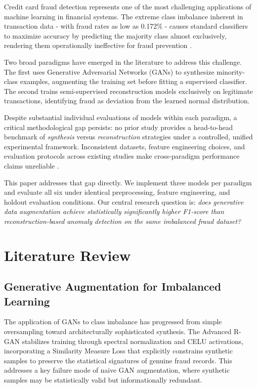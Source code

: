 \documentclass[conference]{IEEEtran}
\begin{document}
Credit card fraud detection represents one of the most challenging
applications of machine learning in financial systems. The extreme class
imbalance inherent in transaction data - with fraud rates as low as
0.172\% - causes standard classifiers to maximize accuracy by predicting
the majority class almost exclusively, rendering them operationally
ineffective for fraud prevention \cite{carcillo2021}.

Two broad paradigms have emerged in the literature to address this
challenge. The first uses Generative Adversarial Networks (GANs) to
synthesize minority-class examples, augmenting the training set before
fitting a supervised classifier. The second trains semi-supervised
reconstruction models exclusively on legitimate transactions, identifying
fraud as deviation from the learned normal distribution.

Despite substantial individual evaluations of models within each paradigm,
a critical methodological gap persists: no prior study provides a
head-to-head benchmark of \textit{synthesis} versus \textit{reconstruction}
strategies under a controlled, unified experimental framework. Inconsistent
datasets, feature engineering choices, and evaluation protocols across
existing studies make cross-paradigm performance claims unreliable
\cite{incremental2021}.

This paper addresses that gap directly. We implement three models per
paradigm and evaluate all six under identical preprocessing, feature
engineering, and holdout evaluation conditions. Our central research
question is: \textit{does generative data augmentation achieve statistically
significantly higher F1-score than reconstruction-based anomaly detection on
the same imbalanced fraud dataset?}

\section{Literature Review}

\subsection{Generative Augmentation for Imbalanced Learning}

The application of GANs to class imbalance has progressed from simple
oversampling toward architecturally sophisticated synthesis. The Advanced
R-GAN \cite{rgan2025} stabilizes training through spectral normalization and
CELU activations, incorporating a Similarity Measure Loss that explicitly
constrains synthetic samples to preserve the statistical signatures of
genuine fraud records. This addresses a key failure mode of naive GAN
augmentation, where synthetic samples may be statistically valid but
informationally redundant.
\end{document}

